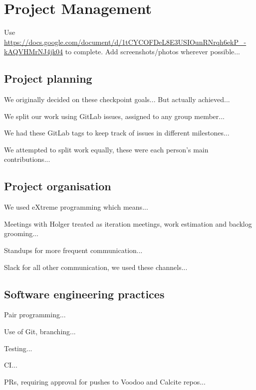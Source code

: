 \chapter{Project Management}

Use \url{https://docs.google.com/document/d/1tCYCOFDeL8E3USIOunRNrqh6ekP_-kAQVHMrNJ4jk04} to complete. Add screenshots/photos wherever possible...

\section{Project planning}

We originally decided on these checkpoint goals...
But actually achieved...

We split our work using GitLab issues, assigned to any group member...

We had these GitLab tags to keep track of issues in different milestones...

We attempted to split work equally, these were each person's main contributions...

\section{Project organisation}

We used eXtreme programming which means...

Meetings with Holger treated as iteration meetings, work estimation and backlog grooming...

Standups for more frequent communication...

Slack for all other communication, we used these channels...

\section{Software engineering practices}

Pair programming...

Use of Git, branching...

Testing...

CI...

PRs, requiring approval for pushes to Voodoo and Calcite repos...
